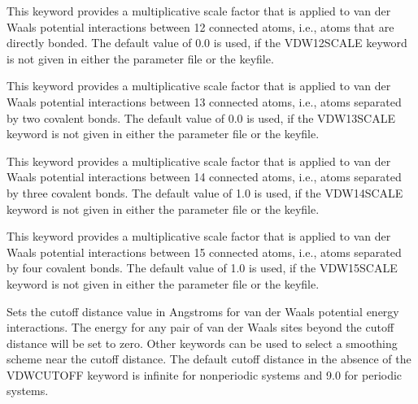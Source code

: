 \documentclass[letterpaper,11pt,english]{sphinxmanual}
\begin{document}
  This keyword provides a multiplicative scale factor that is applied to van der Waals potential interactions between 1\sphinxhyphen{}2 connected atoms, i.e., atoms that are directly bonded. The default value of 0.0 is used, if the VDW\sphinxhyphen{}12\sphinxhyphen{}SCALE keyword is not given in either the parameter file or the keyfile.

  This keyword provides a multiplicative scale factor that is applied to van der Waals potential interactions between 1\sphinxhyphen{}3 connected atoms, i.e., atoms separated by two covalent bonds. The default value of 0.0 is used, if the VDW\sphinxhyphen{}13\sphinxhyphen{}SCALE keyword is not given in either the parameter file or the keyfile.

  This keyword provides a multiplicative scale factor that is applied to van der Waals potential interactions between 1\sphinxhyphen{}4 connected atoms, i.e., atoms separated by three covalent bonds. The default value of 1.0 is used, if the VDW\sphinxhyphen{}14\sphinxhyphen{}SCALE keyword is not given in either the parameter file or the keyfile.

  This keyword provides a multiplicative scale factor that is applied to van der Waals potential interactions between 1\sphinxhyphen{}5 connected atoms, i.e., atoms separated by four covalent bonds. The default value of 1.0 is used, if the VDW\sphinxhyphen{}15\sphinxhyphen{}SCALE keyword is not given in either the parameter file or the keyfile.



  Sets the cutoff distance value in Angstroms for van der Waals potential energy interactions. The energy for any pair of van der Waals sites beyond the cutoff distance will be set to zero. Other keywords can be used to select a smoothing scheme near the cutoff distance. The default cutoff distance in the absence of the VDW\sphinxhyphen{}CUTOFF keyword is infinite for nonperiodic systems and 9.0 for periodic systems.

\end{document}
